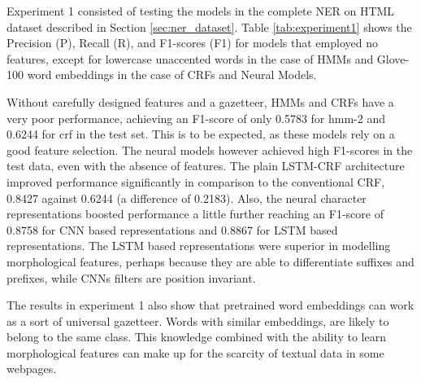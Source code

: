 \documentclass{nle}
\begin{document}
Experiment 1 consisted of testing the models in the complete NER on HTML dataset 
described in Section \ref{sec:ner_dataset}. Table \ref{tab:experiment1} shows the 
Precision (P), Recall (R), and F1-scores (F1) for models that employed no features, 
except for lowercase unaccented words
in the case of HMMs and Glove-100 word embeddings in the case of CRFs and Neural Models.

Without carefully designed features and a gazetteer, HMMs and CRFs have a very 
poor performance, achieving an F1-score of only 0.5783 for hmm-2 and 0.6244 for crf
in the test set. This is to be expected, as these models rely on a good feature selection.
The neural models however achieved high F1-scores in the test
data, even with the absence of features. The plain LSTM-CRF architecture improved performance 
significantly in comparison to the conventional CRF, 0.8427 against 0.6244 (a difference 
of 0.2183). Also, the neural character representations boosted performance a little further
reaching an F1-score of 0.8758 for CNN based representations and 0.8867 for LSTM based
representations. The LSTM based representations were superior in modelling
morphological features, perhaps because they are able to differentiate suffixes and prefixes, 
while CNNs filters are position invariant. 

The results in experiment 1 also show that pretrained word embeddings can work as a sort of
universal gazetteer. Words with similar embeddings, are likely to belong to the same class.
This knowledge combined with the ability to learn morphological features can make up for 
the scarcity of textual data in some webpages.
\end{document}
